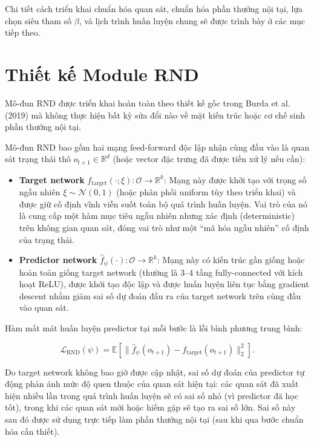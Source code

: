 \documentclass{uetgraduation}
\begin{document}
Chi tiết cách triển khai chuẩn hóa quan sát, chuẩn hóa phần thưởng nội tại, lựa chọn siêu tham số $\beta$, và lịch trình huấn luyện chung sẽ được trình bày ở các mục tiếp theo.

\section{Thiết kế Module RND}\label{sec:rnd-design}

Mô-đun RND được triển khai hoàn toàn theo thiết kế gốc trong Burda et al. (2019) \cite{burda2019} mà không thực hiện bất kỳ sửa đổi nào về mặt kiến trúc hoặc cơ chế sinh phần thưởng nội tại.

Mô-đun RND bao gồm hai mạng feed-forward độc lập nhận cùng đầu vào là quan sát trạng thái thô $o_{t+1} \in \mathbb{R}^{d}$ (hoặc vector đặc trưng đã được tiền xử lý nếu cần):

\begin{itemize}
    \item \textbf{Target network} $f_{\text{target}}(\cdot; \xi) : \mathcal{O} \to \mathbb{R}^{k}$:  
    Mạng này được khởi tạo với trọng số ngẫu nhiên $\xi \sim \mathcal{N}(0,1)$ (hoặc phân phối uniform tùy theo triển khai) và được giữ cố định vĩnh viễn suốt toàn bộ quá trình huấn luyện. Vai trò của nó là cung cấp một hàm mục tiêu ngẫu nhiên nhưng xác định (deterministic) trên không gian quan sát, đóng vai trò như một ``mã hóa ngẫu nhiên'' cố định của trạng thái.

    \item \textbf{Predictor network} $\hat{f}_{\psi}(\cdot) : \mathcal{O} \to \mathbb{R}^{k}$:  
    Mạng này có kiến trúc gần giống hoặc hoàn toàn giống target network (thường là 3--4 tầng fully-connected với kích hoạt ReLU), được khởi tạo độc lập và được huấn luyện liên tục bằng gradient descent nhằm giảm sai số dự đoán đầu ra của target network trên cùng đầu vào quan sát.
\end{itemize}

Hàm mất mát huấn luyện predictor tại mỗi bước là lỗi bình phương trung bình:

\[
\mathcal{L}_{\text{RND}}(\psi) = \mathbb{E} \left[ \| \hat{f}_{\psi}(o_{t+1}) - f_{\text{target}}(o_{t+1}) \|_2^2 \right].
\]

Do target network không bao giờ được cập nhật, sai số dự đoán của predictor tự động phản ánh mức độ quen thuộc của quan sát hiện tại: các quan sát đã xuất hiện nhiều lần trong quá trình huấn luyện sẽ có sai số nhỏ (vì predictor đã học tốt), trong khi các quan sát mới hoặc hiếm gặp sẽ tạo ra sai số lớn. Sai số này sau đó được sử dụng trực tiếp làm phần thưởng nội tại (sau khi qua bước chuẩn hóa cần thiết).
\end{document}
